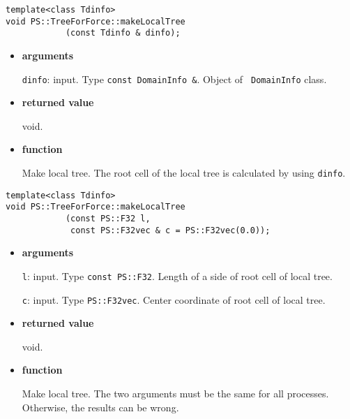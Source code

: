 
\begin{screen}
\begin{verbatim}
template<class Tdinfo>
void PS::TreeForForce::makeLocalTree
            (const Tdinfo & dinfo);
\end{verbatim}
\end{screen}

\begin{itemize}

\item {\bf arguments}

{\tt dinfo}: input. Type {\tt const DomainInfo \&}. Object of {\tt
DomainInfo} class.

\item {\bf returned value}

void.

\item {\bf function}

Make local tree. The root cell of the local tree is calculated by
using {\tt dinfo}.

\end{itemize}

\begin{screen}
\begin{verbatim}
template<class Tdinfo>
void PS::TreeForForce::makeLocalTree
            (const PS::F32 l,
             const PS::F32vec & c = PS::F32vec(0.0));
\end{verbatim}
\end{screen}

\begin{itemize}

\item {\bf arguments}

{\tt l}: input. Type {\tt const PS::F32}. Length of a side of root
cell of local tree.

{\tt c}: input. Type {\tt PS::F32vec}. Center coordinate of root cell of local tree.

\item {\bf returned value}

void.

\item {\bf function}

Make local tree. The two arguments must be the same for all processes. Otherwise, the results can be wrong.

\end{itemize}

